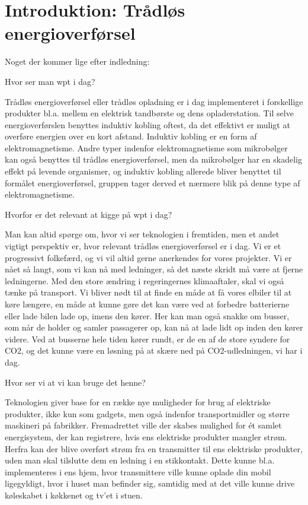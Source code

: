 \section{Introduktion: Trådløs energioverførsel}

Noget der kommer lige efter indledning:

Hvor ser man wpt i dag?

Trådløs energioverførsel eller trådløs opladning er i dag implementeret i forskellige produkter bl.a. mellem en elektrisk tandbørste og dens opladerstation. Til selve energioverførslen benyttes induktiv kobling oftest, da det effektivt er muligt at overføre energien over en kort afstand. Induktiv kobling er en form af elektromagnetisme. Andre typer indenfor elektromagnetisme som mikrobølger kan også benyttes til trådløs energioverførsel, men da mikrobølger har en skadelig effekt på levende organismer, og induktiv kobling allerede bliver benyttet til formålet energioverførsel, gruppen tager derved et nærmere blik på denne type af elektromagnetisme.

Hvorfor er det relevant at kigge på wpt i dag?

Man kan altid spørge om, hvor vi ser teknologien i fremtiden, men et andet vigtigt perspektiv er, hvor relevant trådløs energioverførsel er i dag. Vi er et progressivt folkefærd, og vi vil altid gerne anerkendes for vores projekter. Vi er nået så langt, som vi kan nå med ledninger, så det næste skridt må være at fjerne ledningerne. Med den store ændring i regeringernes klimaaftaler, skal vi også tænke på transport. Vi bliver nødt til at finde en måde at få vores elbiler til at køre længere, en måde at kunne gøre det kan være ved at forbedre batterierne eller lade bilen lade op, imens den kører. Her kan man også snakke om busser, som når de holder og samler passagerer op, kan nå at lade lidt op inden den kører videre. Ved at busserne hele tiden kører rundt, er de en af de store syndere for CO2, og det kunne være en løsning på at skære ned på CO2-udledningen, vi har i dag.

Hvor ser vi at vi kan bruge det henne?

Teknologien giver base for en række nye muligheder for brug af elektriske produkter, ikke kun som gadgets, men også indenfor transportmidler og større maskineri på fabrikker. Fremadrettet ville der skabes mulighed for ét samlet energisystem, der kan registrere, hvis ens elektriske produkter mangler strøm. Herfra kan der blive overført strøm fra en transmitter til ens elektriske produkter, uden man skal tilslutte dem en ledning i en stikkontakt. Dette kunne bl.a. implementeres i ens hjem, hvor transmittere ville kunne oplade din mobil ligegyldigt, hvor i huset man befinder sig, samtidig med at det ville kunne drive køleskabet i køkkenet og tv'et i stuen.

